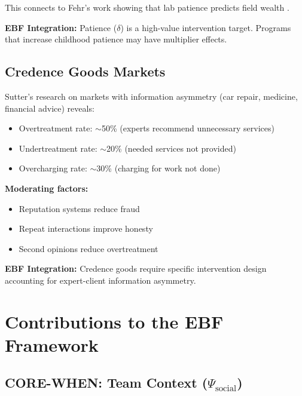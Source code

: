 This connects to Fehr's work showing that lab patience predicts field wealth
\citep{epper2020time}.

\textbf{EBF Integration:} Patience ($\delta$) is a high-value intervention
target. Programs that increase childhood patience may have multiplier effects.

\subsection{Credence Goods Markets}
\label{sec:sut-credence}

Sutter's research on markets with information asymmetry (car repair, medicine,
financial advice) reveals:

\begin{itemize}[nosep]
    \item Overtreatment rate: $\sim$50\% (experts recommend unnecessary services)
    \item Undertreatment rate: $\sim$20\% (needed services not provided)
    \item Overcharging rate: $\sim$30\% (charging for work not done)
\end{itemize}

\textbf{Moderating factors:}
\begin{itemize}[nosep]
    \item Reputation systems reduce fraud
    \item Repeat interactions improve honesty
    \item Second opinions reduce overtreatment
\end{itemize}

\textbf{EBF Integration:} Credence goods require specific intervention design
accounting for expert-client information asymmetry.


\section{Contributions to the EBF Framework}
\label{sec:sut-ebf}

\subsection{CORE-WHEN: Team Context ($\Psi_{\text{social}}$)}

